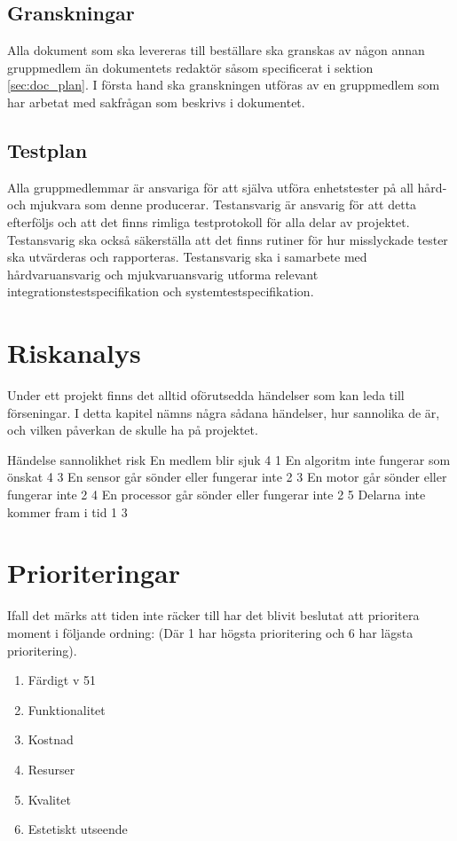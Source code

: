 \documentclass[a4paper,11pt]{article}
\begin{document}
\subsection{Granskningar}
Alla dokument som ska levereras till beställare ska granskas av någon annan gruppmedlem än dokumentets redaktör såsom specificerat i sektion \ref{sec:doc_plan}. I första hand ska granskningen utföras av en gruppmedlem som har arbetat med sakfrågan som beskrivs i dokumentet.

\subsection{Testplan}
Alla gruppmedlemmar är ansvariga för att själva utföra enhetstester på all hård- och mjukvara som denne producerar. Testansvarig är ansvarig för att detta efterföljs och att det finns rimliga testprotokoll för alla delar av projektet. Testansvarig ska också säkerställa att det finns rutiner för hur misslyckade tester ska utvärderas och rapporteras. Testansvarig ska i samarbete med hårdvaruansvarig och mjukvaruansvarig utforma relevant integrationstestspecifikation och systemtestspecifikation.

\section{Riskanalys}
Under ett projekt finns det alltid oförutsedda händelser som kan leda till förseningar. I detta kapitel nämns några sådana händelser, hur sannolika de är, och vilken påverkan de skulle ha på projektet.

Händelse sannolikhet risk
En medlem blir sjuk 4 1
En algoritm inte fungerar som önskat 4 3
En sensor går sönder eller fungerar inte 2 3
En motor går sönder eller fungerar inte 2 4
En processor går sönder eller fungerar inte 2 5
Delarna inte kommer fram i tid 1 3


\section{Prioriteringar}
Ifall det märks att tiden inte räcker till har det blivit beslutat att prioritera moment i följande ordning: (Där 1 har högsta prioritering och 6 har lägsta prioritering).

\begin{enumerate}
	\item Färdigt v 51
	\item Funktionalitet
	\item Kostnad
	\item Resurser
	\item Kvalitet
	\item Estetiskt utseende
\end{enumerate}
\end{document}
